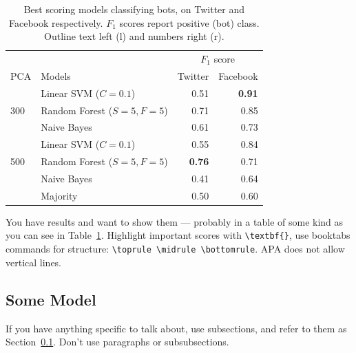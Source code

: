 \documentclass[11pt, a4paper]{article}
\begin{document}
\begin{table}
    \caption{Best scoring models classifying bots, on Twitter and Facebook respectively. $F_1$ scores report positive (bot) class. Outline text left (l) and numbers right (r).}
    \label{tab:results}
    \centering
    \small
    \begin{tabular}{llrr}
        \toprule
                              &                                   & \multicolumn{2}{c}{$F_1$ score} \\
                                                                  \cmidrule{3-4}
        PCA                   &  Models                           &  Twitter        &  Facebook       \\ 
        \midrule
        \multirow{3}{*}{300}  & Linear SVM ($C = 0.1$)            &   0.51          & \textbf{0.91} \\
                              & Random Forest ($S = 5, F = 5$)    &   0.71          & 0.85 \\
                              & Naive Bayes                       &   0.61          & 0.73 \\
        \midrule
        \multirow{3}{*}{500}  & Linear SVM ($C = 0.1$)            &   0.55          & 0.84   \\
                              & Random Forest ($S = 5, F = 5$)    &   \textbf{0.76} & 0.71 \\
                              & Naive Bayes                       &   0.41          & 0.64 \\
        \midrule
                              & Majority                          &   0.50          & 0.60 \\
        \bottomrule
    \end{tabular}
\end{table}

You have results and want to show them --- probably in a table of some kind as you can see in Table~\ref{tab:results}. Highlight important scores with \verb|\textbf{}|, use booktabs commands for structure: \verb|\toprule \midrule \bottomrule|. APA does not allow vertical lines.

\subsection{Some Model} \label{subs:model}

If you have anything specific to talk about, use subsections, and refer to them as Section~\ref{subs:model}. Don't use paragraphs or subsubsections.
\end{document}
